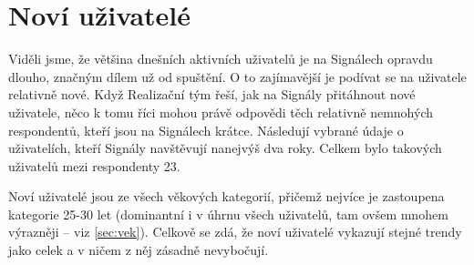 \section{Noví uživatelé}

Viděli jsme, že většina dnešních aktivních uživatelů je na Signálech
opravdu dlouho, značným dílem už od spuštění. O to zajímavější
je podívat se na uživatele relativně nové. Když Realizační tým
řeší, jak na Signály přitáhnout nové uživatele, něco k tomu říci
mohou právě odpovědi těch relativně nemnohých respondentů,
kteří jsou na Signálech krátce. Následují vybrané údaje
o uživatelích, kteří Signály navštěvují nanejvýš dva roky.
Celkem bylo takových uživatelů mezi respondenty 23.

Noví uživatelé jsou ze všech věkových kategorií, přičemž nejvíce
je zastoupena kategorie 25-30 let (dominantní i v úhrnu všech
uživatelů, tam ovšem mnohem výrazněji --
viz \ref{sec:vek}). Celkově se zdá, že noví uživatelé
vykazují stejné trendy jako celek a v ničem z něj zásadně
nevybočují.






